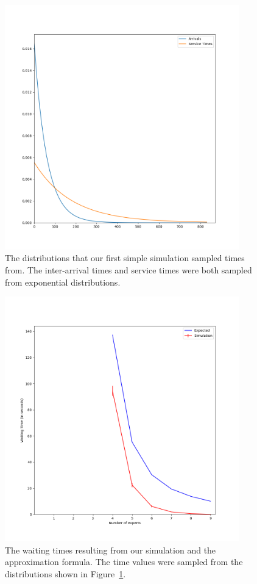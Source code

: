 \begin{figure}[h]
  \includegraphics[width=4in]{figures/montecarlo/expon_expon.png}
  \caption{
    The distributions that our first simple simulation sampled times from.
    The inter-arrival times and service times were both sampled from
    exponential distributions.
  }\label{fig:simple_sim1_dists}
\end{figure}

\begin{figure}[h]
  \includegraphics[width=4in]{figures/montecarlo/independent_calls_expon.png}
  \caption{
    The waiting times resulting from our simulation and the approximation
    formula.
    The time values were sampled from the distributions shown in
    Figure~\ref{fig:simple_sim1_dists}.
  }\label{fig:simple_sim1_results}
\end{figure}

